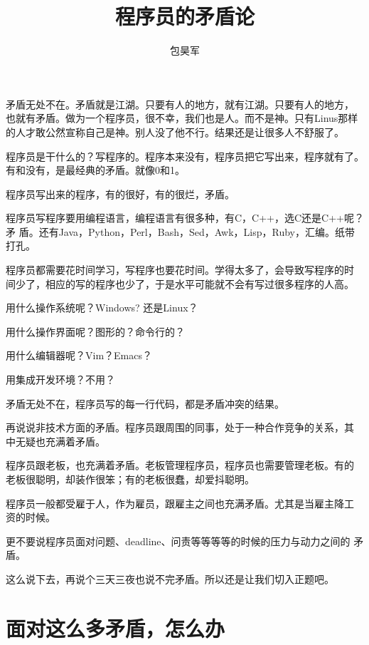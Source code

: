 \documentclass[10pt]{article}
\begin{document}
\begin{CJK*}{UTF8}{simsun}
\CJKtilde

\title{程序员的矛盾论}
\date{}
\author{包昊军}
\maketitle

\section{}

矛盾无处不在。矛盾就是江湖。只要有人的地方，就有江湖。只要有人的地方，
也就有矛盾。做为一个程序员，很不幸，我们也是人。而不是神。只有Linus那样
的人才敢公然宣称自己是神。别人没了他不行。结果还是让很多人不舒服了。

程序员是干什么的？写程序的。程序本来没有，程序员把它写出来，程序就有了。
有和没有，是最经典的矛盾。就像0和1。

程序员写出来的程序，有的很好，有的很烂，矛盾。

程序员写程序要用编程语言，编程语言有很多种，有C，C++，选C还是C++呢？矛
盾。还有Java，Python，Perl，Bash，Sed，Awk，Lisp，Ruby，汇编。纸带打孔。

程序员都需要花时间学习，写程序也要花时间。学得太多了，会导致写程序的时
间少了，相应的写的程序也少了，于是水平可能就不会有写过很多程序的人高。

用什么操作系统呢？Windows? 还是Linux？

用什么操作界面呢？图形的？命令行的？

用什么编辑器呢？Vim？Emacs？

用集成开发环境？不用？

矛盾无处不在，程序员写的每一行代码，都是矛盾冲突的结果。

再说说非技术方面的矛盾。程序员跟周围的同事，处于一种合作竞争的关系，其
中无疑也充满着矛盾。

程序员跟老板，也充满着矛盾。老板管理程序员，程序员也需要管理老板。有的
老板很聪明，却装作很笨；有的老板很蠢，却爱抖聪明。

程序员一般都受雇于人，作为雇员，跟雇主之间也充满矛盾。尤其是当雇主降工
资的时候。

更不要说程序员面对问题、deadline、问责等等等等的时候的压力与动力之间的
矛盾。

这么说下去，再说个三天三夜也说不完矛盾。所以还是让我们切入正题吧。

\section{面对这么多矛盾，怎么办}


\end{CJK*}
\end{document}
